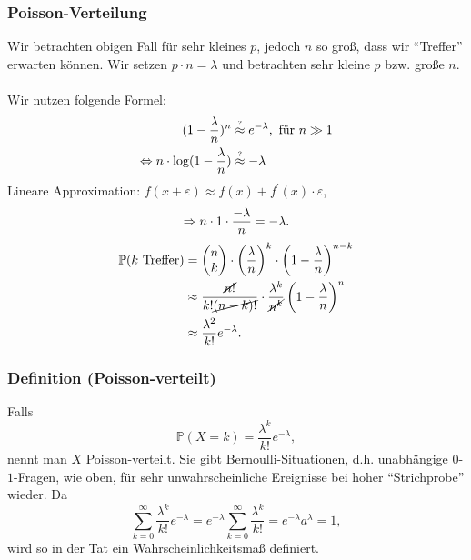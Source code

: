 \subsubsection{Poisson-Verteilung}
Wir betrachten obigen Fall f\"ur sehr kleines $p$, jedoch $n$ so gro\ss{}, dass wir ``Treffer'' erwarten k\"onnen. Wir setzen $p\cdot n=\lambda$ und betrachten sehr kleine $p$ bzw. gro\ss{}e $n$.
\\~\\
Wir nutzen folgende Formel:
\begin{align*}
(1-\frac{\lambda}{n})^n&\textabove{?}{\approx} e^{-\lambda},\ \text{f\"ur }n\gg1\\
\LRA n\cdot\log(1-\frac{\lambda}{n})&\textabove{?}{\approx}-\lambda\\
\end{align*}
Lineare Approximation: $f(x+\varepsilon)\approx f(x)+f^\prime(x)\cdot\varepsilon$,
\[
\Rightarrow n\cdot1\cdot\frac{-\lambda}{n}=-\lambda.
\]
\begin{align*}
\mathbb{P}(k\text{ Treffer})&=\begin{pmatrix}n\\k\end{pmatrix}\cdot\left(\frac{\lambda}{n}\right)^k\cdot\left(1-\frac{\lambda}{n}\right)^{n-k}\\
&\approx\frac{\cancel{n!}}{k!\cancel{(n-k)!}}\cdot\frac{\lambda^k}{\cancel{n^k}}\left(1-\frac{\lambda}{n}\right)^n\\
&\approx\frac{\lambda^2}{k!}e^{-\lambda}.
\end{align*}
\subsubsection{Definition (Poisson-verteilt)}
Falls
\[\mathbb{P}(X=k)=\frac{\lambda^k}{k!}e^{-\lambda},\]
nennt man $X$ Poisson-verteilt. Sie gibt Bernoulli-Situationen, d.h. unabh\"angige $0$-$1$-Fragen, wie oben, f\"ur sehr unwahrscheinliche Ereignisse bei hoher ``Strichprobe'' wieder. Da
\[
\sum_{k=0}^\infty\frac{\lambda^k}{k!}e^{-\lambda}=e^{-\lambda}\sum_{k=0}^\infty\frac{\lambda^k}{k!}=e^{-\lambda}a^{\lambda}=1,
\]
wird so in der Tat ein Wahrscheinlichkeitsma\ss{} definiert.
